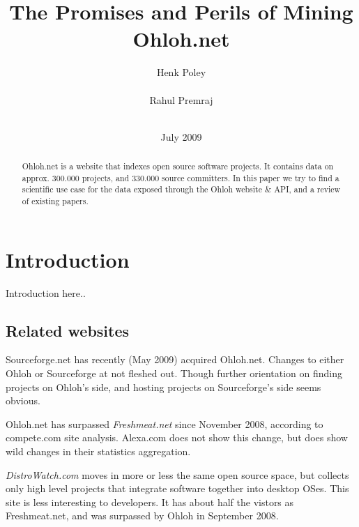 \documentclass{sig-alternate}
\begin{document}
\toappear{} %

\title{The Promises and Perils of Mining Ohloh.net}

\author{
\alignauthor
Henk Poley\\
  \\
\alignauthor Rahul Premraj\\
\\
}

\date{July 2009}


\maketitle

\begin{abstract}
Ohloh.net is a website that indexes open source software projects. It contains data on approx. 300.000 projects, and 330.000 source committers. In this paper we try to find a scientific use case for the data exposed through the Ohloh website \& API, and a review of existing papers.
\end{abstract}


\section{Introduction}
Introduction here..

\subsection{Related websites}
Sourceforge.net has recently (May 2009) acquired Ohloh.net. Changes to either Ohloh or Sourceforge at not fleshed out. Though further orientation on finding projects on Ohloh's side, and hosting projects on Sourceforge's side seems obvious.

Ohloh.net has surpassed \emph{Freshmeat.net} since November 2008, according to compete.com site analysis. Alexa.com does not show this change, but does show wild changes in their statistics aggregation.

\emph{DistroWatch.com} moves in more or less the same open source space, but collects only high level projects that integrate software together into desktop OSes. This site is less interesting to developers. It has about half the vistors as Freshmeat.net, and was surpassed by Ohloh in September 2008.
\end{document}
